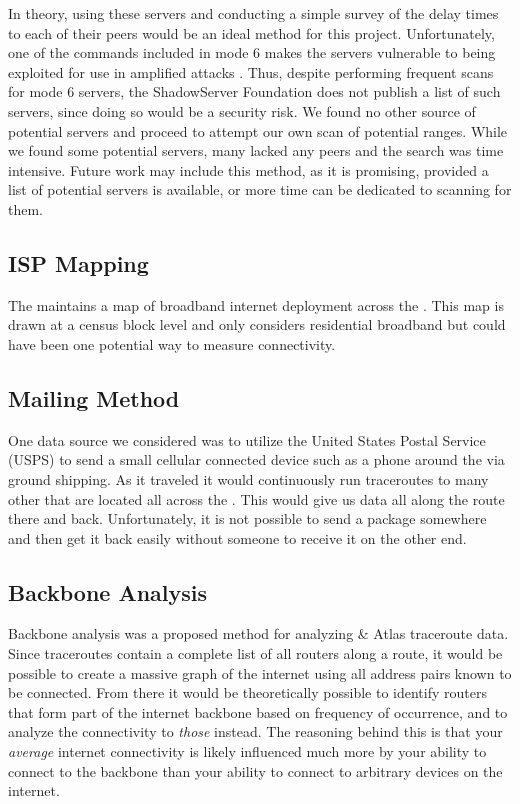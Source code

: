 In theory, using these servers and conducting a simple survey of the delay times to each of their peers would be an ideal method for this project. Unfortunately, one of the commands included in mode 6 makes the servers vulnerable to being exploited for use in amplified \ddos attacks \cite{USDepartmentofHomelandSecurity2014NTPCVE-2013-5211}. Thus, despite performing frequent scans for mode 6 servers, the ShadowServer Foundation does not publish a list of such servers, since doing so would be a security risk. We found no other source of potential servers and proceed to attempt our own scan of potential \ip ranges. While we found some potential servers, many lacked any peers and the search was time intensive. Future work may include this method, as it is promising, provided a list of potential servers is available, or more time can be dedicated to scanning for them.

\subsection{ISP Mapping}
The \FCC maintains a map of broadband internet deployment across the \us \cite{FederalCommunicationsCommission}. This map is drawn at a census block level and only considers residential broadband but could have been one potential way to measure connectivity.

\subsection{Mailing Method} %
One data source we considered was to utilize the United States Postal Service (USPS) to send a small cellular connected device such as a phone around the \us via ground shipping. As it traveled it would continuously run traceroutes to many other \ips that are located all across the \us. This would give us data all along the route there and back. Unfortunately, it is not possible to send a package somewhere and then get it back easily without someone to receive it on the other end.

\subsection{Backbone Analysis}

Backbone analysis was a proposed method for analyzing \caida \& \ripe Atlas traceroute data. Since traceroutes contain a complete list of all routers along a route, it would be possible to create a massive graph of the internet using all \ip address pairs known to be connected. From there it would be theoretically possible to identify routers that form part of the internet backbone based on frequency of occurrence, and to analyze the connectivity to \textit{those} instead. The reasoning behind this is that your \textit{average} internet connectivity is likely influenced much more by your ability to connect to the backbone than your ability to connect to arbitrary devices on the internet.

